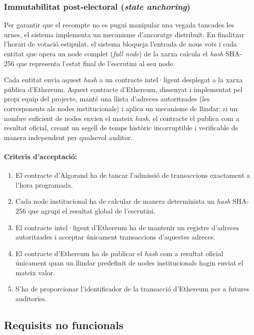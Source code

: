\subsubsection{Immutabilitat post-electoral (\textit{state anchoring})}

Per garantir que el recompte no es pugui manipular una vegada tancades les urnes, el sistema implementa un mecanisme d'ancoratge distribuït. 
En finalitzar l'horari de votació estipulat, el sistema bloqueja l'entrada de nous vots i cada entitat que opera un node complet (\textit{full node}) de la xarxa calcula el \textit{hash} SHA-256 que representa l'estat final de l'escrutini al seu node.

Cada entitat envia aquest \textit{hash} a un contracte intel·ligent desplegat a la xarxa pública d'Ethereum. Aquest contracte d'Ethereum, dissenyat i implementat pel propi equip del projecte, manté una llista d'adreces autoritzades (les corresponents als nodes institucionals) i aplica un mecanisme de llindar: si un nombre suficient de nodes envien el mateix \textit{hash}, el contracte el publica com a resultat oficial, creant un segell de temps històric incorruptible i verificable de manera independent per qualsevol auditor.

\paragraph{Criteris d'acceptació:}
\begin{enumerate}[label=\roman*.]
    \item El contracte d'Algorand ha de tancar l'admissió de transaccions exactament a l'hora programada.
    \item Cada node institucional ha de calcular de manera determinista un \textit{hash} SHA-256 que agrupi el resultat global de l'escrutini.
    \item El contracte intel·ligent d'Ethereum ha de mantenir un registre d'adreces autoritzades i acceptar únicament transaccions d'aquestes adreces.
    \item El contracte d'Ethereum ha de publicar el \textit{hash} com a resultat oficial únicament quan un llindar predefinit de nodes institucionals hagin enviat el mateix valor.
    \item S'ha de proporcionar l'identificador de la transacció d'Ethereum per a futures auditories.
\end{enumerate}

\subsection{Requisits no funcionals}

